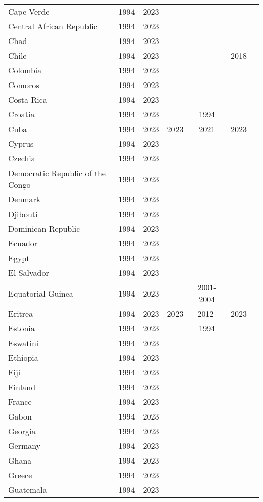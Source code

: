 {\begin{longtable}{lcccccc}
Cape Verde & 1994 & 2023 &  &  &  & \\
Central African Republic & 1994 & 2023 &  &  &  & \\
Chad & 1994 & 2023 &  &  &  & \\
\addlinespace
Chile & 1994 & 2023 &  &  & 2018 & \\
Colombia & 1994 & 2023 &  &  &  & \\
Comoros & 1994 & 2023 &  &  &  & \\
Costa Rica & 1994 & 2023 &  &  &  & \\
Croatia & 1994 & 2023 &  & 1994 &  & \\
\addlinespace
Cuba & 1994 & 2023 & 2023 & 2021 & 2023 & \\
Cyprus & 1994 & 2023 &  &  &  & \\
Czechia & 1994 & 2023 &  &  &  & \\
Democratic Republic of the Congo & 1994 & 2023 &  &  &  & \\
Denmark & 1994 & 2023 &  &  &  & \\
\addlinespace
Djibouti & 1994 & 2023 &  &  &  & \\
Dominican Republic & 1994 & 2023 &  &  &  & \\
Ecuador & 1994 & 2023 &  &  &  & \\
Egypt & 1994 & 2023 &  &  &  & \\
El Salvador & 1994 & 2023 &  &  &  & \\
\addlinespace
Equatorial Guinea & 1994 & 2023 &  & 2001-2004 &  & \\
Eritrea & 1994 & 2023 & 2023 & 2012- & 2023 & \\
Estonia & 1994 & 2023 &  & 1994 &  & \\
Eswatini & 1994 & 2023 &  &  &  & \\
Ethiopia & 1994 & 2023 &  &  &  & \\
\addlinespace
Fiji & 1994 & 2023 &  &  &  & \\
Finland & 1994 & 2023 &  &  &  & \\
France & 1994 & 2023 &  &  &  & \\
Gabon & 1994 & 2023 &  &  &  & \\
Georgia & 1994 & 2023 &  &  &  & \\
\addlinespace
Germany & 1994 & 2023 &  &  &  & \\
Ghana & 1994 & 2023 &  &  &  & \\
Greece & 1994 & 2023 &  &  &  & \\
Guatemala & 1994 & 2023 &  &  &  & \\

\end{longtable}}
